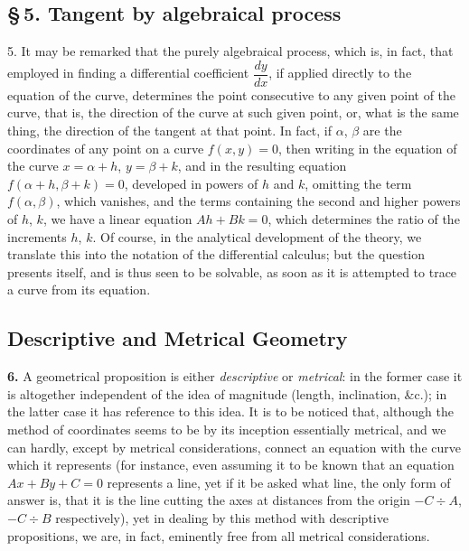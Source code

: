 \documentclass[11pt,a4paper]{book}
\begin{document}
\subsection*{\S\,5. Tangent by algebraical process}

5. It may be remarked that the purely algebraical process, which is, in fact, that employed in finding a differential coefficient $\dfrac{dy}{dx}$, if applied directly to the equation of the curve, determines the point consecutive to any given point of the curve, that is, the direction of the curve at such given point, or, what is the same thing, the direction of the tangent at that point. In fact, if $\alpha$, $\beta$ are the coordinates of any point on a curve $f(x,y)=0$, then writing in the equation of the curve $x=\alpha+h$, $y=\beta+k$, and in the resulting equation $f(\alpha+h,\beta+k)=0$, developed in powers of $h$ and $k$, omitting the term $f(\alpha,\beta)$, which vanishes, and the terms containing the second and higher powers of $h$, $k$, we have a linear equation $Ah+Bk=0$, which determines the ratio of the increments $h$, $k$. Of course, in the analytical development of the theory, we translate this into the notation of the differential calculus; but the question presents itself, and is thus seen to be solvable, as soon as it is attempted to trace a curve from its equation.

\subsection*{Descriptive and Metrical Geometry}

\textbf{6.} A geometrical proposition is either \textit{descriptive} or \textit{metrical}: in the former case it is altogether independent of the idea of magnitude (length, inclination, \&c.); in the latter case it has reference to this idea. It is to be noticed that, although the method of coordinates seems to be by its inception essentially metrical, and we can hardly, except by metrical considerations, connect an equation with the curve which it represents (for instance, even assuming it to be known that an equation $Ax+By+C=0$ represents a line, yet if it be asked what line, the only form of answer is, that it is the line cutting the axes at distances from the origin $-C\div A$, $-C\div B$ respectively), yet in dealing by this method with descriptive propositions, we are, in fact, eminently free from all metrical considerations.
\end{document}
